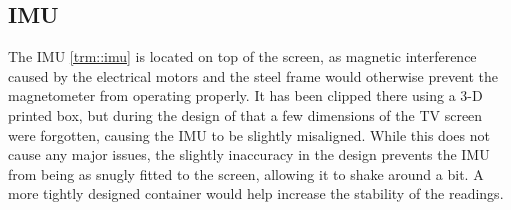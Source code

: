 \subsection{IMU}
The IMU \ref{trm::imu} is located on top of the screen, as magnetic interference caused by the electrical motors and the steel frame would otherwise prevent the magnetometer from operating properly.
It has been clipped there using a 3-D printed box, but during the design of that a few dimensions of the TV screen were forgotten, causing the IMU to be slightly misaligned.
While this does not cause any major issues, the slightly inaccuracy in the design prevents the IMU from being as snugly fitted to the screen, allowing it to shake around a bit.
A more tightly designed container would help increase the stability of the readings.

\newpage
